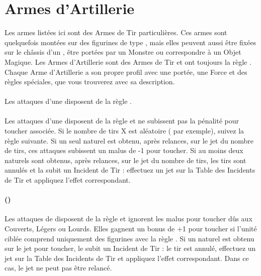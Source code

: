 \newpage
\hypertarget{artilleryweapons}{\section{Armes d'Artillerie}}
\label{artillery_weapons}

Les armes listées ici sont des Armes de Tir particulières. Ces armes sont quelquefois montées sur des figurines de type \warmachine{}, mais elles peuvent aussi être fixées sur le châssis d'un \chariot{}, être portées par un Monstre ou correspondre à un Objet Magique. Les Armes d'Artillerie sont des Armes de Tir et ont toujours la règle \og \reload{} \fg{}. Chaque Arme d'Artillerie a son propre profil avec une portée, une Force et des règles spéciales, que vous trouverez avec sa description.

\paragraph{\boltthrower}

Les attaques d'une \boltthrower{} disposent de la règle \penetrating{}.

\paragraph{}

Les attaques d'une \volleygun{} disposent de la règle  et ne subissent pas la pénalité pour toucher associée. Si le nombre de tirs X est aléatoire ( par exemple), suivez la règle suivante. Si un seul  naturel est obtenu, après relances, sur le jet du nombre de tirs, ces attaques subissent un malus de -1 pour toucher. Si au moins deux  naturels sont obtenus, après relances, sur le jet du nombre de tirs, les tirs sont annulés et la \volleygun{} subit un Incident de Tir : effectuez un jet sur la Table des Incidents de Tir et appliquez l'effet correspondant.

\paragraph{\cannon{} ()}

Les attaques de \cannon{} disposent de la règle \penetrating{} et ignorent les malus pour toucher dûs aux Couverts, Légers ou Lourds. Elles gagnent un bonus de +1 pour toucher si l'unité ciblée comprend uniquement des figurines avec la règle \toweringpresence{}. Si un  naturel est obtenu sur le jet pour toucher, le \cannon{} subit un Incident de Tir : le tir est annulé, effectuez un jet sur la Table des Incidents de Tir et appliquez l'effet correspondant. Dans ce cas, le jet ne peut pas être relancé.

